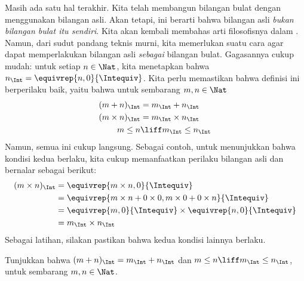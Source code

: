 \documentclass[../../../include/open-logic-section]{subfiles}
\begin{document}
Masih ada satu hal terakhir. Kita telah membangun bilangan bulat dengan
menggunakan bilangan asli. Akan tetapi, ini berarti bahwa bilangan asli
\emph{bukan bilangan bulat itu sendiri}. Kita akan kembali membahas arti
filosofisnya dalam . Namun, dari sudut pandang teknis murni,
kita memerlukan suatu cara agar dapat memperlakukan bilangan asli
\emph{sebagai} bilangan bulat. Gagasannya cukup mudah: untuk setiap $n \in
\Nat$, kita menetapkan bahwa $n_\Int = \equivrep{n, 0}{\Intequiv}$. Kita
perlu memastikan bahwa definisi ini berperilaku baik, yaitu bahwa untuk
sembarang $m, n \in \Nat$
\begin{align*}
	(m + n)_\Int &= m_\Int + n_\Int\\
	(m \times n)_\Int &= m_\Int \times n_\Int\\
	m \leq n &\liff m_\Int \leq n_\Int
\end{align*}
Namun, semua ini cukup langsung. Sebagai contoh, untuk menunjukkan bahwa
kondisi kedua berlaku, kita cukup memanfaatkan perilaku bilangan asli dan
bernalar sebagai berikut:
	\begin{align*}
		(m \times n)_\Int  &= \equivrep{m \times n, 0}{\Intequiv} \\
		&= \equivrep{m \times n + 0 \times 0, m \times 0 + 0 \times n}{\Intequiv} \\
		&= \equivrep{m, 0}{\Intequiv} \times \equivrep{n, 0}{\Intequiv} \\
		&= m_\Int \times n_\Int
	\end{align*}
Sebagai latihan, silakan pastikan bahwa kedua kondisi lainnya berlaku.
\begin{prob}
	Tunjukkan bahwa $(m + n)_\Int = m_\Int + n_\Int$ dan $m \leq n \liff m_\Int \leq n_\Int$, untuk sembarang $m, n \in \Nat$.
\end{prob}
\end{document}
